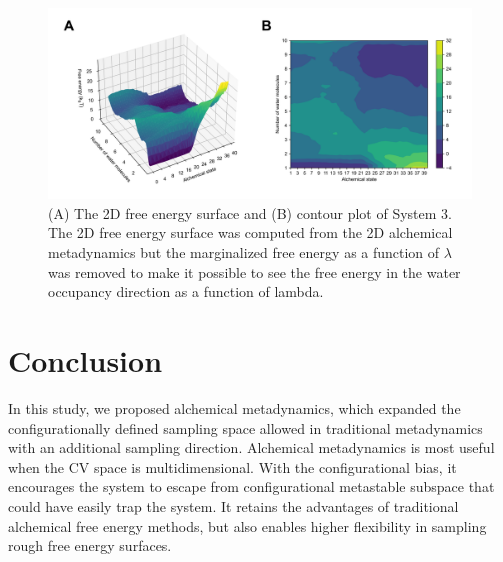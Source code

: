 \documentclass[journal=jacsat,manuscript=article]{achemso}
\begin{document}
\begin{figure}[ht]
    \centering
    \includegraphics[width=\textwidth]{Figures/sys3_2d_fes_contour_annotated.png}  
    \caption{(A) The 2D free energy surface and (B) contour plot of System 3. The 2D free energy surface was computed from the 2D alchemical metadynamics but the marginalized free energy as a function of $\lambda$ was removed to make it possible to see the free energy in the water occupancy direction as a function of lambda.}
    \label{sys3_2d_fes_contour}
\end{figure}

\section{Conclusion}
In this study, we proposed alchemical metadynamics, which expanded the configurationally defined sampling space allowed in traditional metadynamics with an additional sampling direction. Alchemical metadynamics is most useful when the CV space is multidimensional. With the configurational bias, it encourages the system to escape from configurational metastable subspace that could have easily trap the system. It retains the advantages of traditional alchemical free energy methods, but also enables higher flexibility in sampling rough free energy surfaces. 
\end{document}
